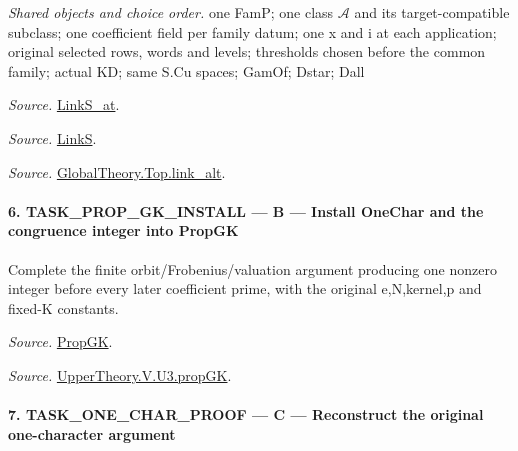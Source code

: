\documentclass[11pt,a4paper]{article}
\numberwithin{equation}{section}
\theoremstyle{remark}\newtheorem{remark}[theorem]{Remark}
\begin{document}
\emph{Shared objects and choice order.} one FamP; one class $\mathcal A$ and its target-compatible subclass; one coefficient field per family datum; one x and i at each application; original selected rows, words and levels; thresholds chosen before the common family; actual KD; same S.Cu spaces; GamOf; Dstar; Dall

\emph{Source.} \href{https://github.com/CocoSgt/riemann-hypothesis-lean/blob/7cbf7a0c32fca1badf05931879a37c3f8a2b03b4/src/Formalism/SharpRestriction/GlobalTheoremInputs.lean#L145-L149}{LinkS\_\allowbreak at}.

\emph{Source.} \href{https://github.com/CocoSgt/riemann-hypothesis-lean/blob/7cbf7a0c32fca1badf05931879a37c3f8a2b03b4/src/Formalism/SharpRestriction/GlobalTheoremInputs.lean#L152-L157}{LinkS}.

\emph{Source.} \href{https://github.com/CocoSgt/riemann-hypothesis-lean/blob/7cbf7a0c32fca1badf05931879a37c3f8a2b03b4/src/Development/AbelianVarietyTheory/Proofs/GlobalInterpolation/LinkAlt.lean#L16-L50}{GlobalTheory.Top.link\_\allowbreak alt}.



\paragraph{6. TASK\_\allowbreak PROP\_\allowbreak GK\_\allowbreak INSTALL — B — Install OneChar and the congruence integer into PropGK}

Complete the finite orbit/Frobenius/valuation argument producing one nonzero integer before every later coefficient prime, with the original e,N,kernel,p and fixed-K constants.

\emph{Source.} \href{https://github.com/CocoSgt/riemann-hypothesis-lean/blob/7cbf7a0c32fca1badf05931879a37c3f8a2b03b4/src/Development/AutomorphicArithmetic/AutomorphicVarieties/UnitaryThreeGroups/KatoUse.lean#L36-L42}{PropGK}.

\emph{Source.} \href{https://github.com/CocoSgt/riemann-hypothesis-lean/blob/7cbf7a0c32fca1badf05931879a37c3f8a2b03b4/src/Development/AutomorphicArithmetic/AutomorphicVarieties/UnitaryThreeGroups/OrbEquiv.lean#L111-L173}{UpperTheory.V.U3.propGK}.



\paragraph{7. TASK\_\allowbreak ONE\_\allowbreak CHAR\_\allowbreak PROOF — C — Reconstruct the original one-character argument}
\end{document}

